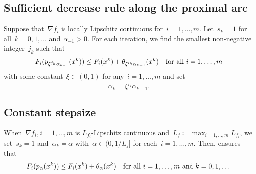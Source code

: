 \documentclass[../main]{subfiles}
\begin{document}
\subsection{Sufficient decrease rule along the proximal arc} 
Suppose that~$\nabla f_i$ is locally Lipschitz continuous for~$i = 1, \dots, m$.
Let~$s_k = 1$ for all~$k = 0, 1, \dots$ and~$\alpha_{-1} > 0$.
For each iteration, we find the smallest non-negative integer~$j_k$ such that
\begin{equation} \label{eq:pgm_sdc}
    F_i(p_{\xi^{j_k} \alpha_{k - 1}}(x^k)) \le F_i(x^k) + \theta_{\xi^{j_k} \alpha_{k - 1}}(x^k) \quad \text{for all~$i = 1, \dots, m$}
\end{equation} 
with some constant~$\xi \in (0, 1)$ for any~$i = 1, \dots, m$ and set
\begin{equation} \label{eq:pgm_sdc_step}
    \alpha_k = \xi^{j_k} \alpha_{k - 1}.
\end{equation}

\subsection{Constant stepsize} 
When~$\nabla f_i, i = 1, \dots, m$ is $L_{f_i}$-Lipschitz continuous and~$L_f \coloneqq \max_{i = 1, \dots, m} L_{f_i}$, we set~$s_k = 1$ and~$\alpha_k = \alpha$ with~$\alpha \in (0, 1 / L_f]$ for each~$i = 1, \dots, m$.
Then,  ensures that
\begin{equation} \label{eq:pgm_constant}
    F_i(p_\alpha(x^k)) \le F_i(x^k) + \theta_\alpha(x^k) \quad \text{for all~$i = 1, \dots, m \text{ and } k = 0, 1, \dots$}
\end{equation} 
\end{document}
